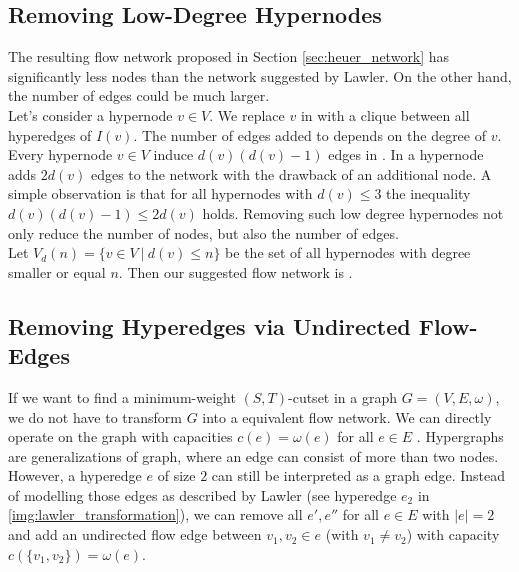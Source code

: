 \subsection{Removing Low-Degree Hypernodes}
\label{sec:degree_network}

The resulting flow network  proposed in Section \ref{sec:heuer_network} has significantly
less nodes than the network  suggested by Lawler. On the other hand, the number of
edges could be much larger. \\
Let's consider a hypernode $v \in V$. We replace $v$ in  with a clique between all
hyperedges of $I(v)$. The number of edges added to  depends on the degree of
$v$. Every hypernode $v \in V$ induce $d(v)(d(v) - 1)$ edges in . In  a hypernode adds $2d(v)$ edges to the network with the drawback
of an additional node. A simple observation is that for all hypernodes with $d(v) \le 3$ the inequality
$d(v)(d(v) - 1) \le 2d(v)$ holds. Removing such low degree hypernodes not only reduce
the number of nodes, but also the number of edges. \\
Let $V_{d}(n) = \{v \in V\ |\ d(v) \le n\}$ be the set of all hypernodes
with degree smaller or equal $n$. Then our suggested flow network is .

\subsection{Removing Hyperedges via Undirected Flow-Edges}
\label{sec:edge_size_network}

If we want to find a minimum-weight $(S,T)$-cutset in a graph $G = (V,E,\omega)$, we do not have to transform
$G$ into a equivalent flow network. We can directly operate on the graph with capacities
$c(e) = \omega(e)$ for all $e \in E$ \cite{ford1956maximal}. Hypergraphs are generalizations of graph, where
an edge can consist of more than two nodes. However, a hyperedge $e$ of size $2$ can still be 
interpreted as a graph edge. Instead of modelling those edges as described by Lawler \cite{lawler1973}
(see hyperedge $e_2$ in \autoref{img:lawler_transformation}), we can remove all $e',e''$ for all $e \in E$
with $|e| = 2$ and add an undirected flow edge between $v_1,v_2 \in e$ (with $v_1 \neq v_2$) with
capacity $c(\{v_1,v_2\}) = \omega(e)$.

